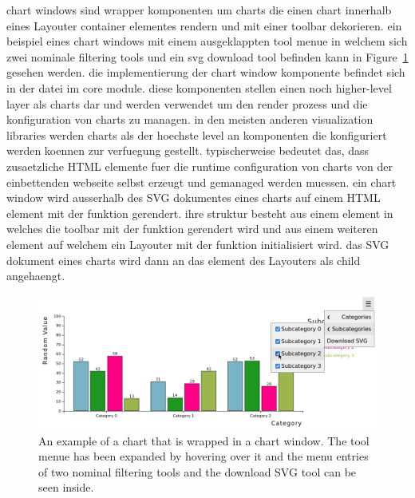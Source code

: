 chart windows sind wrapper komponenten um charts die einen chart innerhalb eines Layouter container elementes rendern und mit einer toolbar dekorieren.
ein beispiel eines chart windows mit einem ausgeklappten tool menue in welchem sich zwei nominale filtering tools und ein svg download tool befinden kann in Figure~\ref{fig:ChartWindow} gesehen werden.
die implementierung der chart window komponente befindet sich in der  datei im core module.
diese komponenten stellen einen noch higher-level layer als charts dar und werden verwendet um den render prozess und die konfiguration von charts zu managen.
in den meisten anderen visualization libraries werden charts als der hoechste level an komponenten die konfiguriert werden koennen zur verfuegung gestellt.
typischerweise bedeutet das, dass zusaetzliche HTML elemente fuer die runtime configuration von charts von der einbettenden webseite selbst erzeugt und gemanaged werden muessen.     
ein chart window wird ausserhalb des SVG dokumentes eines charts auf einem HTML  element mit der  funktion gerendert.
ihre struktur besteht aus einem  element in welches die toolbar mit der  funktion gerendert wird und aus einem weiteren  element auf welchem ein Layouter mit der  funktion initialisiert wird. 
das SVG dokument eines charts wird dann an das  element des Layouters als child angehaengt.

\begin{figure}[tp]
  \centering
  \includegraphics[keepaspectratio,width=\linewidth,height=\fullh]{images/chart-window.png}
  \caption[Chart Window Example]{
    An example of a chart that is wrapped in a chart window.
    The tool menue has been expanded by hovering over it and the menu entries of two nominal filtering tools and the download SVG tool can be seen inside.
  }
  \label{fig:ChartWindow}
\end{figure}


